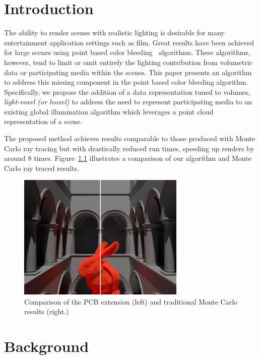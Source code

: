 \documentclass[12pt]{ucthesis}
\begin{document}





\chapter{Introduction}
\label{intro}

The ability to render scenes with realistic lighting is desirable for many entertainment application settings such as film.  Great results have been achieved for large scenes using point based color bleeding~\cite{christensen:2008} algorithms.  These algorithms, however, tend to limit or omit entirely the lighting contribution from volumetric data or participating media within the scenes.  This paper presents an algorithm to address this missing component in the point based color bleeding algorithm.  Specifically, we propose the addition of a data representation tuned to volumes,  \emph{light-voxel (or lvoxel)} to address the need to represent participating media to an existing global illumination algorithm which leverages a point cloud representation of a scene.  

  The proposed method achieves results comparable to those produced with Monte Carlo ray tracing but with drastically reduced run times, speeding up renders by around 8 times.  Figure~\ref{fig:compare} illustrates a comparison of our algorithm and Monte Carlo ray traced results.

\begin{figure}[h!]
    \centering
    \includegraphics[width=80mm]{img/compare.png}
    \caption{Comparison of the PCB extension (left) and traditional Monte Carlo results (right.)}
    \label{fig:compare}
\end{figure}



\chapter{Background}
\label{background}
\end{document}
